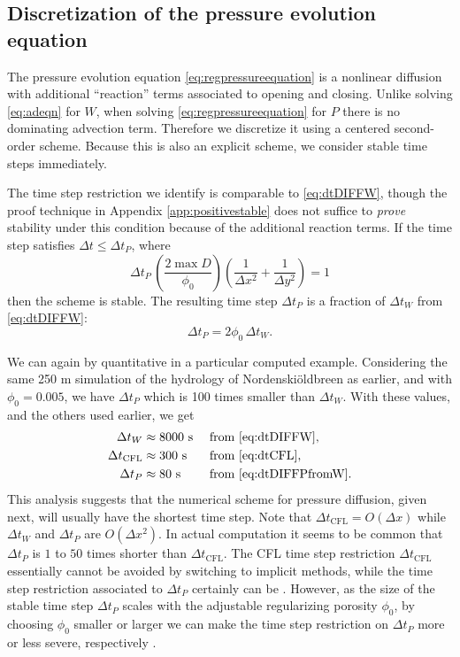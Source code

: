 \documentclass[11pt,final]{amsart}
\newcommand{\Nbreen}{Nordenski\"oldbreen\xspace}
\begin{document}
\subsection*{Discretization of the pressure evolution equation}  The pressure evolution equation \eqref{eq:regpressureequation} is a nonlinear diffusion with additional ``reaction'' terms associated to opening and closing.  Unlike solving \eqref{eq:adeqn} for $W$, when solving \eqref{eq:regpressureequation} for $P$ there is no dominating advection term.  Therefore we discretize it using a centered second-order scheme.  Because this is also an explicit scheme, we consider stable time steps immediately.

The time step restriction we identify is comparable to \eqref{eq:dtDIFFW}, though the proof technique in Appendix \ref{app:positivestable} does not suffice to \emph{prove} stability under this condition because of the additional reaction terms.  If the time step satisfies $\Delta t \le \Delta t_P$, where
\begin{equation}
\Delta t_P\, \left(\frac{2 \max D}{\phi_0}\right) \left(\frac{1}{\Delta x^2} + \frac{1}{\Delta y^2}\right) = 1 \label{eq:dtDIFFP}
\end{equation}
then the scheme is stable.  The resulting time step $\Delta t_P$ is a fraction of $\Delta t_W$ from \eqref{eq:dtDIFFW}:
\begin{equation}
\Delta t_P = 2 \phi_0\, \Delta t_W.  \label{eq:dtDIFFPfromW}
\end{equation}

We can again by quantitative in a particular computed example.  Considering the same 250 m simulation of the hydrology of \Nbreen as earlier, and with $\phi_0 = 0.005$, we have $\Delta t_P$ which is 100 times smaller than $\Delta t_W$.  With these values, and the others used earlier, we get
\begin{align*}
  \Delta t_W            &\approx 8000 \text{ s} &&\text{ from \eqref{eq:dtDIFFW}}, \\
  \Delta t_{\text{CFL}} &\approx 300  \text{ s} &&\text{ from \eqref{eq:dtCFL}}, \\
  \Delta t_P            &\approx 80   \text{ s} &&\text{ from \eqref{eq:dtDIFFPfromW}.}
\end{align*}
This analysis suggests that the numerical scheme for pressure diffusion, given next, will usually have the shortest time step.  Note that $\Delta t_{\text{CFL}}=O(\Delta x)$ while $\Delta t_W$ and $\Delta t_P$ are $O(\Delta x^2)$.  In actual computation it seems to be common that $\Delta t_P$ is $1$ to $50$ times shorter than $\Delta t_{\text{CFL}}$.  The CFL time step restriction $\Delta t_{\text{CFL}}$ essentially cannot be avoided by switching to implicit methods, while the time step restriction associated to $\Delta t_P$ certainly can be \citep{Schoofetal2012,Hewittetal2012}.  However, as the size of the stable time step $\Delta t_P$ scales with the adjustable regularizing porosity $\phi_0$, by choosing $\phi_0$ smaller or larger we can make the time step restriction on $\Delta t_P$ more or less severe, respectively \citep[compare][]{Clarke2003}.
\end{document}
